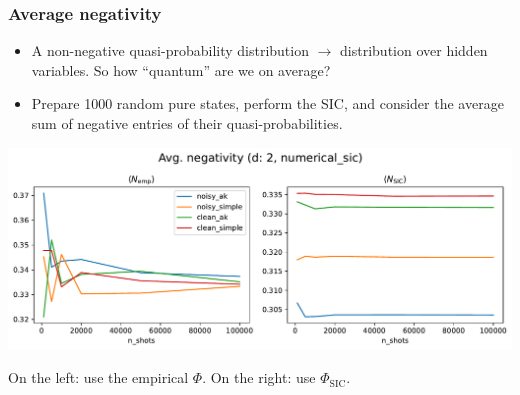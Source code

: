 \documentclass{beamer}
\begin{document}
\begin{frame}
\frametitle{Average negativity}
\begin{itemize}
\item A non-negative quasi-probability distribution $\rightarrow$ distribution over hidden variables. So how ``quantum'' are we on average?
\item Prepare 1000 random pure states, perform the SIC, and consider the average sum of negative entries of their quasi-probabilities.
\end{itemize}
	\begin{center}
	\includegraphics[scale=0.45]{img/avg_neg_d2_numerical_sic}	
	\begin{small}On the left: use the empirical $\Phi$. On the right: use $\Phi_{\text{SIC}}$.	\end{small}	\end{center}
\end{frame}
\end{document}
